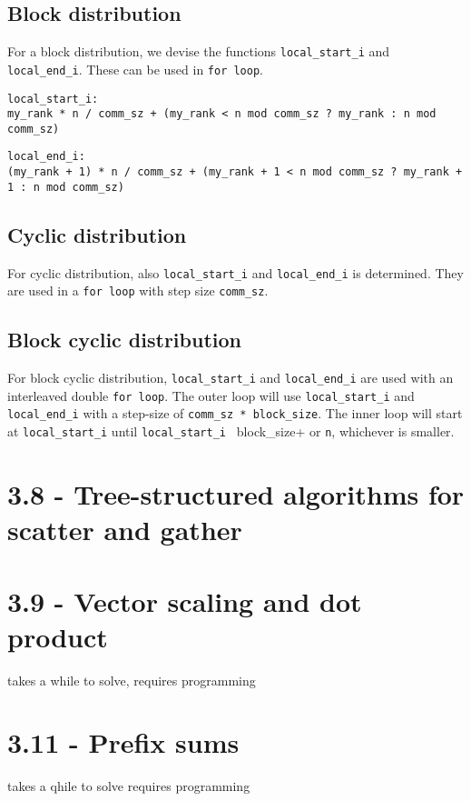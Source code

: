 \documentclass[a4paper,11pt,twoside]{article}
\begin{document}
\subsection*{Block distribution}
For a block distribution, we devise the functions \verb+local_start_i+ and \verb+local_end_i+. These can be used in \verb+for loop+. 

\begin{verbatim}
local_start_i:
my_rank * n / comm_sz + (my_rank < n mod comm_sz ? my_rank : n mod comm_sz)
\end{verbatim}
\begin{verbatim}
local_end_i:
(my_rank + 1) * n / comm_sz + (my_rank + 1 < n mod comm_sz ? my_rank + 1 : n mod comm_sz)
\end{verbatim}

\subsection*{Cyclic distribution}
For cyclic distribution, also \verb+local_start_i+ and \verb+local_end_i+ is determined. They are used in a \verb+for loop+ with step size \verb+comm_sz+.


\subsection*{Block cyclic distribution}
For block cyclic distribution, \verb+local_start_i+ and \verb+local_end_i+ are used with an interleaved double \verb+for loop+.  The outer loop will use \verb+local_start_i+ and \verb+local_end_i+  with a step-size of \verb+comm_sz * block_size+. The inner loop will start at \verb+local_start_i+ until \verb+local_start_i + block_size+ or \verb+n+, whichever is smaller.


\section{3.8 - Tree-structured algorithms for scatter and gather}

\section{3.9 - Vector scaling and dot product}
takes a while to solve,
requires programming

\section{3.11 - Prefix sums}
takes a qhile to solve
requires programming
\end{document}

